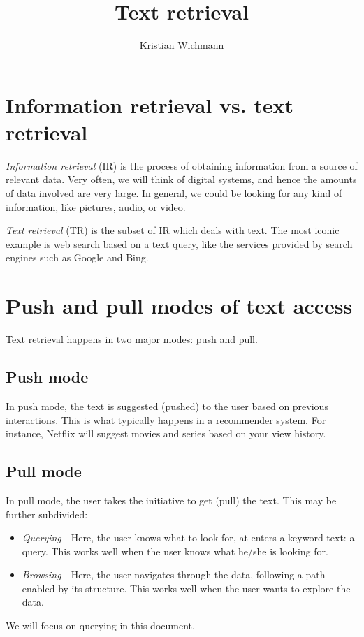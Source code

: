 \documentclass[12pt, a4paper]{article}
\title{Text retrieval}
\author{Kristian Wichmann}
\numberwithin{equation}{section}
\begin{document}
\maketitle

\section{Information retrieval vs. text retrieval}
\textit{Information retrieval} (IR) is the process of obtaining information from a source of relevant data. Very often, we will think of digital systems, and hence the amounts of data involved are very large. In general, we could be looking for any kind of information, like pictures, audio, or video.

\textit{Text retrieval} (TR) is the subset of IR which deals with text. The most iconic example is web search based on a text query, like the services provided by search engines such as Google and Bing.

\section{Push and pull modes of text access}
Text retrieval happens in two major modes: push and pull.

\subsection{Push mode}
In push mode, the text is suggested (pushed) to the user based on previous interactions. This is what typically happens in a recommender system. For instance, Netflix will suggest movies and series based on your view history.

\subsection{Pull mode}
In pull mode, the user takes the initiative to get (pull) the text. This may be further subdivided:
\begin{itemize}
\item\textit{Querying} - Here, the user knows what to look for, at enters a keyword text: a query. This works well when the user knows what he/she is looking for.
\item\textit{Browsing} - Here, the user navigates through the data, following a path enabled by its structure. This works well when the user wants to explore the data.
\end{itemize}
We will focus on querying in this document.
\end{document}
